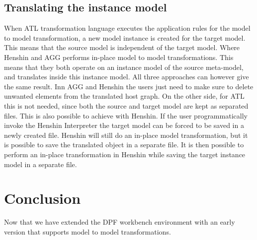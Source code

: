 \subsection{Translating the instance model}

When ATL transformation language executes the application rules for the model to
model transformation, a new model instance is created for the target model. This
means that the source model is independent of the target model. Where Henshin
and AGG performs in-place model to model transformations. This means that they
both operate on an instance model of the source meta-model, and translates
inside this instance model. All three approaches can however give the same
result. Inn AGG and Henshin the users just need to make sure to delete unwanted
elements from the translated host graph. On the other side, for ATL this is not
needed, since both the source and target model are kept as separated files. This
is also possible to achieve with Henshin. If the user programmatically invoke
the Henshin Interpreter the target model can be forced to be saved in a newly
created file. Henshin will still do an in-place model transformation, but it is
possible to save the translated object in a separate file. It is then possible
to perform an in-place transformation in Henshin while saving the target
instance model in a separate file. 

\section{Conclusion}

Now that we have extended the DPF workbench environment with an early version
that supports model to model transformations.

